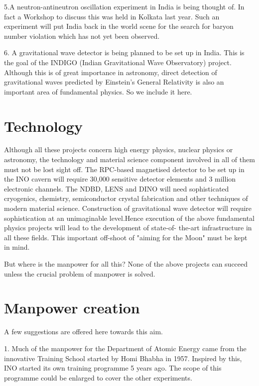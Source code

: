 5.A neutron-antineutron oscillation experiment in India
is being thought of. In fact a Workshop to discuss this
was held in Kolkata last year. Such an experiment
will put India back in the world scene for the search
for baryon number violation which has not yet been observed.

6. A gravitational wave detector is being planned to be
set up in India. This is the goal of the INDIGO (Indian 
Gravitational Wave Observatory) project. Although this
is of great importance in astronomy, direct detection
of gravitational waves predicted by Einstein's General
Relativity is also an important area of fundamental 
physics. So we include it here.

\section*{Technology}

Although all these projects concern high energy physics,
nuclear physics or astronomy, the technology and material 
science component involved in all of them must not be 
lost sight off. The RPC-based magnetised detector to be
set up in the INO cavern will require 30,000 sensitive
detector elements and 3 million electronic
channels. The NDBD, LENS and DINO will
need sophisticated cryogenics, chemistry, semiconductor
crystal fabrication and other techniques of modern
material science. Construction of gravitational wave
detector will require sophistication at an unimaginable 
level.Hence execution of the above fundamental
physics projects will lead to the development of state-of-
the-art infrastructure in all these fields. This important 
off-shoot of "aiming for the Moon" must be kept in mind.     

But where is the manpower for all this? None of the above
projects can succeed unless the crucial problem of
manpower is solved. 

\section{Manpower creation}

A few suggestions are offered here towards this aim.

1. Much of the manpower for the Department of Atomic Energy
came from the innovative Training School started by Homi Bhabha 
in 1957. Inspired by this, INO started its own training
programme 5 years ago. The scope of this programme could be 
enlarged to cover the other experiments.

